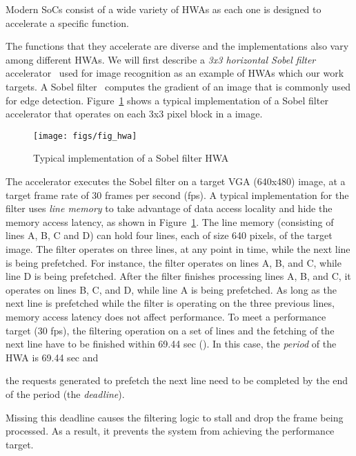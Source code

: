 \documentclass[10pt,letterpaper]{article}
\newcommand{\ADD}[1]{#1}
\newif\ifSQUEEZE
\begin{document}
Modern SoCs consist of a wide variety of HWAs as each one is designed to
accelerate a specific function. 
\ifSQUEEZE
The functions that they accelerate are diverse
and the implementations also vary among different HWAs. 
As an example, we will first describe a typical implementation of a 
\emph{3x3 horizontal Sobel filter} accelerator~\cite{Sobel} (shown in Figure~\ref{fig:HWAexample}), 
which computes the gradient of an image for image recognition. 
\else
The functions that they accelerate are diverse
and the implementations also vary among different HWAs. 
We will first describe a
\emph{3x3 horizontal Sobel filter} accelerator~\cite{Sobel} used for image recognition as an
example of HWAs which our work targets. 
A Sobel filter~\cite{Sobel} computes the gradient of an image that is commonly used for edge detection. 
Figure~\ref{fig:HWAexample}
shows a typical implementation of a Sobel filter accelerator that operates on
each 3x3 pixel block in a image.
\fi

\begin{figure}[h!]
  \centering
  \texttt{[image: figs/fig\_hwa]}
  \caption{Typical implementation of a Sobel filter HWA}
  \label{fig:HWAexample}
\end{figure}

The accelerator executes the Sobel filter on a target VGA
(640x480) image, at a target frame rate of 30 frames per second
(fps). 
A typical implementation for the filter uses \emph{line memory}
to take advantage of data access locality and hide the memory
access latency, as shown in Figure~\ref{fig:HWAexample}. The line
memory (consisting of lines A, B, C and D) can hold four lines,
each of size 640 pixels, of the target image. The filter operates
on three lines, at any point in time, while the next line is being
prefetched. For instance, the filter operates on lines A, B, and
C, while line D is being prefetched. After the filter finishes
processing lines A, B, and C, it operates on lines B, C, and D,
while line A is being prefetched. As long as the next line is
prefetched while the filter is operating on the three previous
lines, memory access latency does not affect performance. To meet
a performance target (30 fps), the filtering operation on a
set of lines and the fetching of the next line have to be finished within
69.44 sec (). In this case,
the \emph{period} of the HWA is 69.44 sec and 
\ifSQUEEZE
the next line needs to be prefetched by the
end of the period (the \emph{deadline}).
\else
the requests
generated to prefetch the next line need to be completed by the
end of the period (the \emph{deadline}). 
\fi
Missing this deadline
causes the filtering logic to stall \ADD{and drop the frame being
processed}. As a result, it prevents the system from achieving the
performance target.
\end{document}
